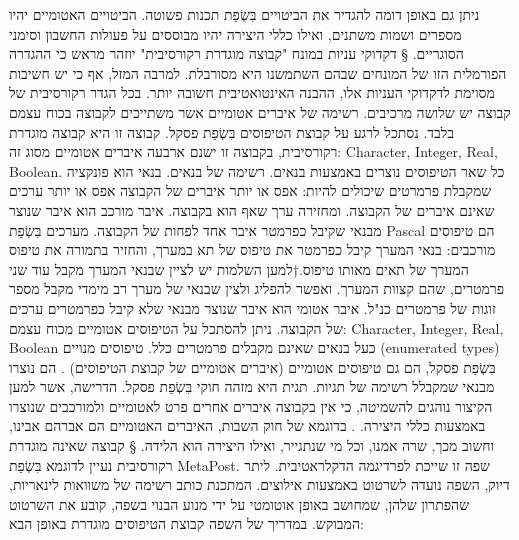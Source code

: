 ניתן גם באופן דומה להגדיר את הביטויים בִּשְׂפַת תכנות פשוטה. הביטויים האטומיים יהיו מספרים ושמות משתנים, ואילו כללי היצירה יהיו מבוססים על פעולות החשבון וסימני הסוגריים.
§ דקדוקי עניות במונח "קבוצה מוגדרת רקורסיבית"
יוזהר מראש כי ההגדרה הפורמלית הזו של המונחים שבהם השתמשנו היא מסורבלת. למרבה המזל, אף כי יש חשיבות מסוימת לדקדוקי העניות אלו, ההבנה האינטואטיבית חשובה יותר.
בכל הגדר רקורסיבית של קבוצה יש שלושה מרכיבים.
רשימה של איברים אטומיים אשר משתייכים לקבוצה בכוח עצמם בלבד.
נסתכל לרגע על קבוצת הטיפוסים בִּשְׂפַת פסקל. קבוצה זו היא קבוצה מוגדרת רקורסיבית, בקבוצה זו ישנם ארבעה איברים אטומיים מסוג זה: Character, Integer, Real, Boolean. כל שאר הטיפוסים נוצרים באמצעות בנאים.
רשימה של בנאים.
בנאי הוא פונקציה שמקבלת פרמרטים שיכולים להיות:
אפס או יותר איברים של הקבוצה
אפס או יותר ערכים שאינם איברים של הקבוצה.
ומחזירה ערך שאף הוא בקבוצה.
איבר מורכב הוא איבר שנוצר מבנאי שקיבל כפרמטר איבר אחד לפחות של הקבוצה.
מערכים בִּשְׂפַת Pascal הם טיפוסים מורכבים: בנאי המערך קיבל כפרמטר את טיפוס של תא במערך, והחזיר בתמורה את טיפוס המערך של תאים מאותו טיפוס.†{למען השלמות יש לציין שבנאי המערך מקבל עוד שני פרמטרים, שהם קצוות המערך. ואפשר להפליג ולצין שבנאי של מערך רב מימדי מקבל מספר זוגות של פרמטרים כנ"ל.}
איבר אטומי הוא איבר שנוצר מבנאי שלא קיבל כפרמטרים ערכים של הקבוצה.
ניתן להסתכל על הטיפוסים אטומיים מכוח עצמם: Character, Integer, Real, Boolean כעל בנאים שאינם מקבלים פרמטרים כלל.
טיפוסים מנויים (enumerated types) בִּשְׂפַת פסקל, הם גם טיפוסים אטומיים (איברים אטומיים של קבוצת הטיפוסים) . הם נוצרו מבנאי שמקבלל רשימה של תגיות. תגית היא מזהה חוקי בִּשְׂפַת פסקל.
הדרישה, אשר למען הקיצור נוהגים להשמיטה, כי אין בקבוצה איברים אחרים פרט לאטומיים ולמורכבים שנוצרו באמצעות כללי היצירה. .
בדוגמא של חוק השבות, האיברים האטומיים הם אברהם אבינו, וחשוב מכך, שרה אמנו, וכל מי שנתגייר, ואילו היצירה הוא הלידה.
§ קבוצה שאינה מוגדרת רקורסיבית
נעיין לדוגמא בִּשְׂפַת MetaPost. שפה זו שייכת לפרדיגמה הדקלראטיבית. ליתר דיוק, השפה נועדה לשרטוט באמצעות אילוצים. המתכנת כותב רשימה של משוואות לינאריות, שהפתרון שלהן, שמחושב באופן אוטומטי על ידי מנוע הבנוי בשפה, קובע את השרטוט המבוקש.
במדריך של השפה קבוצת הטיפוסים מוגדרת באופן הבא:

